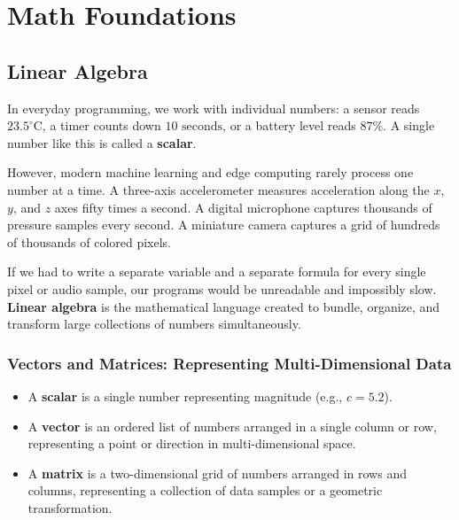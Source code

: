 \chapter{Math Foundations}\label{ch:math_foundations}
\section{Linear Algebra}\label{sec:linear_algebra}

In everyday programming, we work with individual numbers: a sensor reads $23.5^\circ\text{C}$, a timer counts down $10\text{ seconds}$, or a battery level reads $87\%$. A single number like this is called a \textbf{scalar}. 

However, modern machine learning and edge computing rarely process one number at a time. A three-axis accelerometer measures acceleration along the $x$, $y$, and $z$ axes fifty times a second. A digital microphone captures thousands of pressure samples every second. A miniature camera captures a grid of hundreds of thousands of colored pixels. 

If we had to write a separate variable and a separate formula for every single pixel or audio sample, our programs would be unreadable and impossibly slow. \textbf{Linear algebra} is the mathematical language created to bundle, organize, and transform large collections of numbers simultaneously.

\subsection{Vectors and Matrices: Representing Multi-Dimensional Data}

\begin{keyidea}
\begin{itemize}
    \item A \textbf{scalar} is a single number representing magnitude (e.g., $c = 5.2$).
    \item A \textbf{vector} is an ordered list of numbers arranged in a single column or row, representing a point or direction in multi-dimensional space.
    \item A \textbf{matrix} is a two-dimensional grid of numbers arranged in rows and columns, representing a collection of data samples or a geometric transformation.
\end{itemize}
\end{keyidea}

